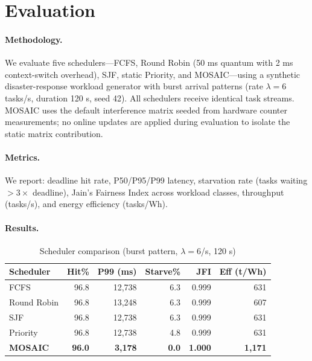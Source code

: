 \documentclass[sigconf,10pt]{acmart}
\newcommand{\sys}{MOSAIC\xspace}
\begin{document}
\section{Evaluation}

\paragraph{Methodology.}
We evaluate five schedulers—FCFS, Round Robin (50 ms quantum with 2 ms
context-switch overhead), SJF, static Priority, and \sys—using a
synthetic disaster-response workload generator with burst arrival patterns
(rate $\lambda = 6$ tasks/s, duration 120 s, seed 42). All schedulers
receive identical task streams. \sys uses the default interference matrix
seeded from hardware counter measurements; no online updates are applied
during evaluation to isolate the static matrix contribution.

\paragraph{Metrics.}
We report: deadline hit rate, P50/P95/P99 latency, starvation rate (tasks
waiting $>3\times$ deadline), Jain's Fairness Index across workload
classes, throughput (tasks/s), and energy efficiency (tasks/Wh).

\paragraph{Results.}

\begin{table}[h]
\small
\caption{Scheduler comparison (burst pattern, $\lambda=6$/s, 120 s)}
\label{tab:results}
\begin{tabular}{lrrrrr}
\toprule
Scheduler & Hit\% & P99 (ms) & Starve\% & JFI & Eff (t/Wh) \\
\midrule
FCFS           & 96.8 & 12{,}738 & 6.3 & 0.999 &  631 \\
Round Robin    & 96.8 & 13{,}248 & 6.3 & 0.999 &  607 \\
SJF            & 96.8 & 12{,}738 & 6.3 & 0.999 &  631 \\
Priority       & 96.8 & 12{,}738 & 4.8 & 0.999 &  631 \\
\textbf{\sys}  & \textbf{96.0} & \textbf{3{,}178} & \textbf{0.0} &
                 \textbf{1.000} & \textbf{1{,}171} \\
\bottomrule
\end{tabular}
\end{table}
\end{document}
